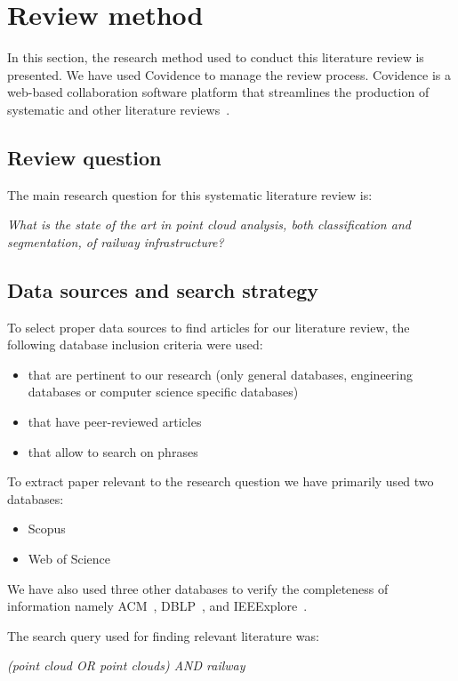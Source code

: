 \section{Review method}\label{sec:stoa:review-method}
In this section, the research method used to conduct this literature review is presented. We have used Covidence to manage the review process. Covidence is a web-based collaboration software platform that streamlines the production of systematic and other literature reviews~\cite{covidence}.

\subsection{Review question}\label{sec:stoa:review-questions}
The main research question for this systematic literature review is:

\begin{center}
    \textit{What is the state of the art in point cloud analysis, both classification and segmentation, of railway infrastructure?}
\end{center}	

\subsection{Data sources and search strategy} %
To select proper data sources to find articles for our literature review, the following database inclusion criteria were used:
\begin{itemize}
	\item that are pertinent to our research (only general databases, engineering databases or computer science specific databases)
	\item that have peer-reviewed articles
	\item that allow to search on phrases
\end{itemize}	

To extract paper relevant to the research question we have primarily used two databases:
\begin{itemize}
    \item Scopus \cite{scopus}
    \item Web of Science \cite{web-of-science}
\end{itemize}
We have also used three other databases to verify the completeness of information namely ACM~\cite{acm}, DBLP~\cite{dblp}, and IEEExplore~\cite{ieeexplore}.

The search query used for finding relevant literature was:
\begin{center}
    \textit{ (point cloud OR point clouds) AND railway}
\end{center}

